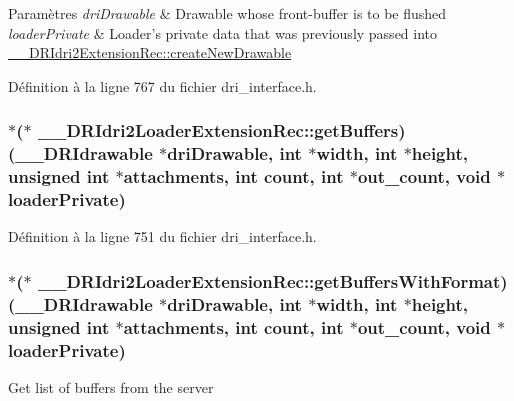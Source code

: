 \begin{DoxyParams}{Paramètres}
{\em dri\-Drawable} & Drawable whose front-\/buffer is to be flushed \\
\hline
{\em loader\-Private} & Loader's private data that was previously passed into \hyperlink{struct_____d_r_idri2_extension_rec_ad8dee7e9945357051c9fe893d34f06fe}{\-\_\-\-\_\-\-D\-R\-Idri2\-Extension\-Rec\-::create\-New\-Drawable} \\
\hline
\end{DoxyParams}


Définition à la ligne 767 du fichier dri\-\_\-interface.\-h.

\hypertarget{struct_____d_r_idri2_loader_extension_rec_aaddcff60eea6077e13b8f240bca17851}{
\subsubsection[{get\-Buffers}]{$\ast$($\ast$ \-\_\-\-\_\-\-D\-R\-Idri2\-Loader\-Extension\-Rec\-::get\-Buffers)({\bf \-\_\-\-\_\-\-D\-R\-Idrawable} $\ast$dri\-Drawable, int $\ast${\bf width}, int $\ast${\bf height}, unsigned int $\ast$attachments, int {\bf count}, int $\ast$out\-\_\-count, {\bf void} $\ast$loader\-Private)}}\label{struct_____d_r_idri2_loader_extension_rec_aaddcff60eea6077e13b8f240bca17851}


Définition à la ligne 751 du fichier dri\-\_\-interface.\-h.

\hypertarget{struct_____d_r_idri2_loader_extension_rec_a4fc1ed3cfad3c47df68f9c4d555760b2}{
\subsubsection[{get\-Buffers\-With\-Format}]{$\ast$($\ast$ \-\_\-\-\_\-\-D\-R\-Idri2\-Loader\-Extension\-Rec\-::get\-Buffers\-With\-Format)({\bf \-\_\-\-\_\-\-D\-R\-Idrawable} $\ast$dri\-Drawable, int $\ast${\bf width}, int $\ast${\bf height}, unsigned int $\ast$attachments, int {\bf count}, int $\ast$out\-\_\-count, {\bf void} $\ast$loader\-Private)}}\label{struct_____d_r_idri2_loader_extension_rec_a4fc1ed3cfad3c47df68f9c4d555760b2}
Get list of buffers from the server

